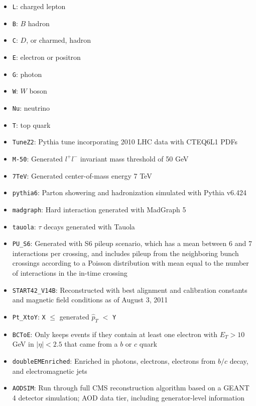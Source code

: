 \documentclass[dissertation.tex]{subfiles}
\begin{document}
\begin{itemize}
\item \verb+L+: charged lepton
\item \verb+B+: $B$ hadron
\item \verb+C+: $D$, or charmed, hadron
\item \verb+E+: electron or positron
\item \verb+G+: photon
\item \verb+W+: $W$ boson
\item \verb+Nu+: neutrino
\item \verb+T+: top quark
\item \verb+TuneZ2+: Pythia tune incorporating 2010 LHC data with CTEQ6L1 \cite{CTEQ6} PDFs \cite{LPCC_MBUE_WG}
\item \verb+M-50+: Generated $l^{+}l^{-}$ invariant mass threshold of 50 GeV
\item \verb+7TeV+: Generated center-of-mass energy 7 TeV
\item \verb+pythia6+: Parton showering and hadronization simulated with Pythia v6.424 \cite{Pythia6}
\item \verb+madgraph+: Hard interaction generated with MadGraph 5 \cite{MadGraph}
\item \verb+tauola+: $\tau$ decays generated with Tauola \cite{Tauola}
\item \verb+PU_S6+: Generated with S6 pileup scenario, which has a mean between 6 and 7 interactions per crossing, and includes pileup from the neighboring bunch crossings according to a Poisson distribution with mean equal to the number of interactions in the in-time crossing \cite{PUS6}
\item \verb+START42_V14B+: Reconstructed with best alignment and calibration constants and magnetic field conditions as of August 3, 2011
\item \verb+Pt_XtoY+: \verb+X+ $\leq$ generated $\hat{p}_{T}$ $<$ \verb+Y+
\item \verb+BCToE+: Only keeps events if they contain at least one electron with $E_{T} > 10$ GeV in $|\eta| < 2.5$ that came from a $b$ or $c$ quark
\item \verb+doubleEMEnriched+: Enriched in photons, electrons, electrons from $b/c$ decay, and electromagnetic jets \cite{doubleEMEnriched_filter_cfg}
\item \verb+AODSIM+: Run through full CMS reconstruction algorithm based on a GEANT 4 \cite{GEANT} detector simulation; AOD data tier, including generator-level information
\end{itemize}
\end{document}
